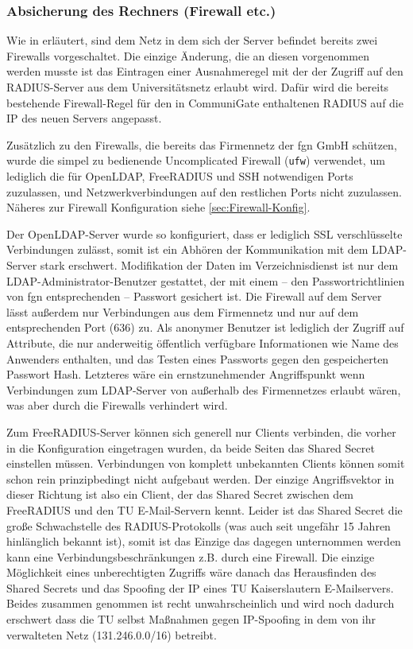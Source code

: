 \documentclass[11pt,a4paper,titlepage=firstiscover,headsepline,bibtotoc]{scrartcl} %
\begin{document}
\subsubsection{Absicherung des Rechners (Firewall etc.)}
Wie in  erläutert, sind dem Netz in dem sich der Server befindet bereits zwei Firewalls vorgeschaltet. Die einzige Änderung, die an diesen vorgenommen werden musste ist das Eintragen einer Ausnahmeregel mit der der Zugriff auf den RADIUS-Server aus dem Universitätsnetz erlaubt wird. Dafür wird die bereits bestehende Firewall-Regel für den in CommuniGate enthaltenen RADIUS auf die IP des neuen Servers angepasst.

Zusätzlich zu den Firewalls, die bereits das Firmennetz der fgn GmbH schützen, wurde die simpel zu bedienende Uncomplicated Firewall (\texttt{ufw}) verwendet, um lediglich die für OpenLDAP, FreeRADIUS und SSH notwendigen Ports zuzulassen, und Netzwerkverbindungen auf den restlichen Ports nicht zuzulassen. Näheres zur Firewall Konfiguration siehe \autoref{sec:Firewall-Konfig}.

Der OpenLDAP-Server wurde so konfiguriert, dass er lediglich SSL verschlüsselte Verbindungen zulässt, somit ist ein Abhören der Kommunikation mit dem LDAP-Server stark erschwert. Modifikation der Daten im Verzeichnisdienst ist nur dem LDAP-Administrator-Benutzer gestattet, der mit einem -- den Passwortrichtlinien von fgn entsprechenden -- Passwort gesichert ist. Die Firewall auf dem Server lässt außerdem nur Verbindungen aus dem Firmennetz und nur auf dem entsprechenden Port (636) zu. Als anonymer Benutzer ist lediglich der Zugriff auf Attribute, die nur anderweitig öffentlich verfügbare Informationen wie Name des Anwenders enthalten, und das Testen eines Passworts gegen den gespeicherten Passwort Hash. Letzteres wäre ein ernstzunehmender Angriffspunkt wenn Verbindungen zum LDAP-Server von außerhalb des Firmennetzes erlaubt wären, was aber durch die Firewalls verhindert wird.

Zum FreeRADIUS-Server können sich generell nur Clients verbinden, die vorher in die Konfiguration eingetragen wurden, da beide Seiten das Shared Secret einstellen müssen. Verbindungen von komplett unbekannten Clients können somit schon rein prinzipbedingt nicht aufgebaut werden. Der einzige Angriffsvektor in dieser Richtung ist also ein Client, der das Shared Secret zwischen dem FreeRADIUS und den TU E-Mail-Servern kennt. Leider ist das Shared Secret die große Schwachstelle des RADIUS-Protokolls (was auch seit ungefähr 15 Jahren hinlänglich bekannt ist), somit ist das Einzige das dagegen unternommen werden kann eine Verbindungsbeschränkungen z.B. durch eine Firewall. Die einzige Möglichkeit eines unberechtigten Zugriffs wäre danach das Herausfinden des Shared Secrets und das Spoofing der IP eines TU Kaiserslautern E-Mailservers. Beides zusammen genommen ist recht unwahrscheinlich und wird noch dadurch erschwert dass die TU selbst Maßnahmen gegen IP-Spoofing in dem von ihr verwalteten Netz (131.246.0.0/16) betreibt.
\end{document}
